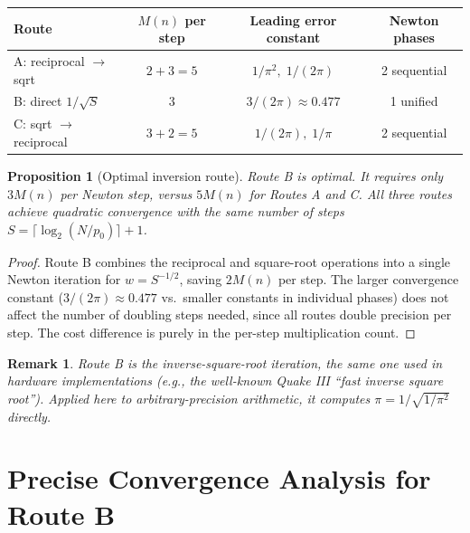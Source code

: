 \documentclass[11pt]{article}
\newtheorem{proposition}[theorem]{Proposition}
\newtheorem{remark}[theorem]{Remark}
\begin{document}
\begin{center}
\begin{tabular}{lccc}
\toprule
\textbf{Route} & \textbf{$M(n)$ per step} & \textbf{Leading error constant} & \textbf{Newton phases} \\
\midrule
A: reciprocal $\to$ sqrt & $2 + 3 = 5$ & $1/\pi^2,\; 1/(2\pi)$ & 2 sequential \\
B: direct $1/\sqrt{S}$ & $3$ & $3/(2\pi) \approx 0.477$ & 1 unified \\
C: sqrt $\to$ reciprocal & $3 + 2 = 5$ & $1/(2\pi),\; 1/\pi$ & 2 sequential \\
\bottomrule
\end{tabular}
\end{center}

\begin{proposition}[Optimal inversion route]\label{prop:optimal-route}
Route B is optimal. It requires only $3M(n)$ per Newton step, versus $5M(n)$ for Routes A and C. All three routes achieve quadratic convergence with the same number of steps $S = \lceil \log_2(N/p_0) \rceil + 1$.
\end{proposition}

\begin{proof}
Route B combines the reciprocal and square-root operations into a single Newton iteration for $w = S^{-1/2}$, saving $2M(n)$ per step. The larger convergence constant ($3/(2\pi) \approx 0.477$ vs.\ smaller constants in individual phases) does not affect the number of doubling steps needed, since all routes double precision per step. The cost difference is purely in the per-step multiplication count. \qedhere
\end{proof}

\begin{remark}
Route B is the inverse-square-root iteration, the same one used in hardware implementations (e.g., the well-known Quake III ``fast inverse square root''). Applied here to arbitrary-precision arithmetic, it computes $\pi = 1/\sqrt{1/\pi^2}$ directly.
\end{remark}

\section{Precise Convergence Analysis for Route B}
\label{sec:convergence-detail}
\end{document}

